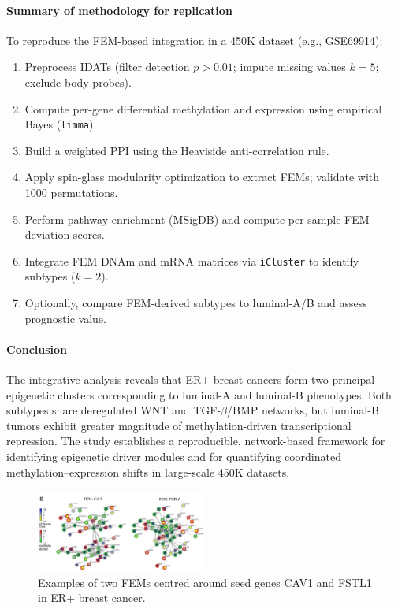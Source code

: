 \documentclass[10pt]{extarticle}
\begin{document}
\paragraph{Summary of methodology for replication}
To reproduce the FEM-based integration in a 450K dataset (e.g., GSE69914):
\begin{enumerate}
\item Preprocess IDATs (filter detection $p>0.01$; impute missing values $k=5$; exclude body probes).
\item Compute per-gene differential methylation and expression using empirical Bayes (\texttt{limma}).
\item Build a weighted PPI using the Heaviside anti-correlation rule.
\item Apply spin-glass modularity optimization to extract FEMs; validate with 1000 permutations.
\item Perform pathway enrichment (MSigDB) and compute per-sample FEM deviation scores.
\item Integrate FEM DNAm and mRNA matrices via \texttt{iCluster} to identify subtypes ($k=2$).
\item Optionally, compare FEM-derived subtypes to luminal-A/B and assess prognostic value.
\end{enumerate}

\paragraph{Conclusion}
The integrative analysis reveals that ER+ breast cancers form two principal epigenetic clusters corresponding to luminal-A and luminal-B phenotypes. Both subtypes share deregulated WNT and TGF-$\beta$/BMP networks, but luminal-B tumors exhibit greater magnitude of methylation-driven transcriptional repression. The study establishes a reproducible, network-based framework for identifying epigenetic driver modules and for quantifying coordinated methylation–expression shifts in large-scale 450K datasets.

\begin{figure}[h]
    \centering
    \includegraphics[width=0.5\textwidth]{Figures/Examples of two FEMs centred around seed genes CAV1 and FSTL1 in ER+ breast cancer.jpg} %
    \caption{Examples of two FEMs centred around seed genes CAV1 and FSTL1 in ER+ breast cancer.}
    \label{fig:FEMs}
\end{figure}
\end{document}
